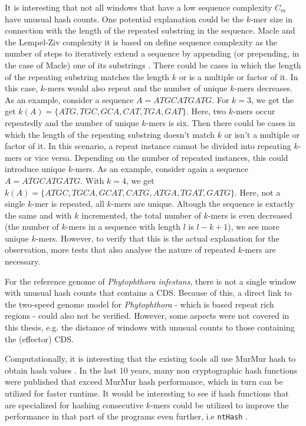 It is interesting that not all windows that have a low sequence complexity $C_m$
have unusual hash counts. One potential explanation could be the $k$-mer size in
connection with the length of the repeated substring in the sequence. Macle and
the Lempel-Ziv complexity it is based on define sequence complexity as the
number of steps to iteratively extend a sequence by appending (or prepending, in
the case of Macle) one of its substrings
\cite{pirogovHighcomplexityRegionsMammalian2019,lempelComplexityFiniteSequences1976}.
There could be cases in which the length of the repeating substring matches the
length $k$ or is a multiple or factor of it. In this case, $k$-mers would also
repeat and the number of unique $k$-mers decreases. As an example, consider a
sequence $A = ATGCATGATG$. For $k=3$, we get the get $k(A) = \{ATG, TGC, GCA,
CAT, TGA, GAT\}$. Here, two $k$-mers occur repeatedly and the number of unique
$k$-mers is six. Then there could be cases in which the length of the repeating
substring doesn't match $k$ or isn't a multiple or factor of it. In this
scenario, a repeat instance cannot be divided into repeating $k$-mers or vice
versa. Depending on the number of repeated instances, this could introduce
unique $k$-mers. As an example, consider again a sequence $A = ATGCATGATG$. With
$k=4$, we get $k(A)=\{ATGC, TGCA, GCAT, CATG, ATGA, TGAT, GATG\}$. Here, not a
single $k$-mer is repeated, all $k$-mers are unique. Altough the sequence is
extactly the same and with $k$ incremented, the total number of $k$-mers is even
decreased (the number of $k$-mers in a sequence with length $l$ is $l-k+1$), we
see more unique $k$-mers. However, to verify that this is the actual explanation
for the observation, more tests that also analyse the nature of repeated
$k$-mers are necessary. 

For the reference genome of \textit{Phytophthora infestans}, there is not a
single window with unusual hash counts that contains a CDS. Because of this, a
direct link to the two-speed genome model for \textit{Phytophthora} - which is
based repeat rich regions - could also not be verified. However, some aspects
were not covered in this thesis, e.g. the distance of windows with unusual
counts to those containing the (effector) CDS.

Computationally, it is interesting that the existing tools all use MurMur hash
to obtain hash values
\cite{ondovMashFastGenome2016,bagciMicrobialPhylogeneticContext2021,irberLightweightCompositionalAnalysis2022}.
In the last 10 years, many non cryptographic hash functions were published that
exceed MurMur hash performance, which in turn can be utilized for faster
runtime. It would be interesting to see if hash functions that are specialized
for hashing consecutive $k$-mers could be utilized to improve the performance in
that part of the programs even further, i.e \texttt{ntHash}
\cite{mohamadiNtHashRecursiveNucleotide2016}.

